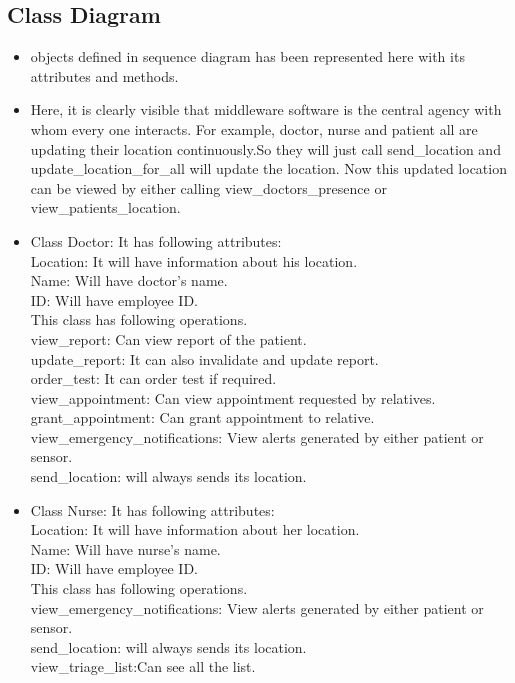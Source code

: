 \documentclass[a4paper,10pt]{report} %
\begin{document}
\subsection {Class Diagram}
\begin{itemize}
\item objects defined in sequence diagram has been represented here with
its attributes and methods.
\item Here, it is clearly visible that middleware software is the
central agency with whom every one interacts. For example, doctor,
nurse and patient all are updating their location continuously.So they
will just call send\_location and update\_location\_for\_all will update
the location. Now this updated location can be viewed by either calling
view\_doctors\_presence or view\_patients\_location.
\item Class Doctor: It has following attributes: \\
Location: It will have information about his location. \\
Name: Will have doctor's name.\\
ID: Will have employee ID.\\
This class has following operations. \\
view\_report: Can view report of the patient. \\
update\_report: It can also invalidate and update report.\\
order\_test: It can order test if required. \\
view\_appointment: Can view appointment requested by relatives.
grant\_appointment: Can grant appointment to relative. \\
view\_emergency\_notifications: View alerts generated by either patient
or sensor. \\
send\_location: will always sends its location.
\item Class Nurse: It has following attributes: \\
Location: It will have information about her location. \\
Name: Will have nurse's name.\\
ID: Will have employee ID.\\
This class has following operations. \\
view\_emergency\_notifications: View alerts generated by either patient
or sensor. \\
send\_location: will always sends its location.\\
view\_triage\_list:Can see all the list.\\

\end{itemize}
\end{document}
